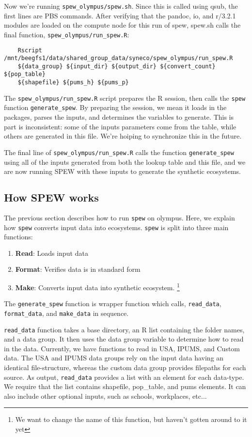 \documentclass{article}
\begin{document}
Now we're running \verb|spew_olympus/spew.sh|. Since this is called using qsub, the first lines are PBS commands. After verifying that the pandoc, io, and r/3.2.1 modules are loaded on the compute node for this run of spew, spew.sh calls the final function, \verb|spew_olympus/run_spew.R|:

\begin{verbatim}
	Rscript /mnt/beegfs1/data/shared_group_data/syneco/spew_olympus/run_spew.R 
	${data_group} ${input_dir} ${output_dir} ${convert_count} ${pop_table} 
	${shapefile} ${pums_h} ${pums_p}
\end{verbatim}	

The \verb|spew_olympus/run_spew.R| script prepares the R session, then calls the \verb|spew| function \verb|generate_spew|. By preparing the session, we mean it loads in the packages, parses the inputs, and determines the variables to generate. This is part is inconsistent: some of the inputs parameters come from the table, while others are generated in this file. We're hoiping to synchronize this in the future. 

The final line of \verb|spew_olympus/run_spew.R| calls the function \verb|generate_spew| using all of the inputs generated from both the lookup table and this file, and we are now running SPEW with these inputs to generate the synthetic ecosystems. 

\subsection{How SPEW works}
The previous section describes how to run \verb|spew| on olympus. Here, we explain how \verb|spew| converts input data into ecosystems. \verb|spew| is split into three main functions:

\begin{enumerate}
	\item \textbf{Read}: Loads input data
	\item \textbf{Format}: Verifies data is in standard form 
	\item \textbf{Make}: Converts input data into synthetic ecosystem. \footnote{We want to change the name of this function, but haven't gotten around to it yet}
\end{enumerate}

The \verb|generate_spew| function is  wrapper function which calls, \verb|read_data|, \verb|format_data|, and \verb|make_data| in sequence.

\verb|read_data| function takes a base directory, an R list containing the folder names, and a data group. It then uses the data group variable to determine how to read in the data. Currently, we have functions to read in USA, IPUMS, and Custom data. The USA and IPUMS data groups rely on the input data having an identical file-structure, whereas the custom data group provides filepaths for each source. As output, \verb|read_data| provides a list with an element for each data-type. We require that the list contains shapefile, pop\_table, and pums elements. It can also include other optional inputs, such as schools, workplaces, etc...
\end{document}
